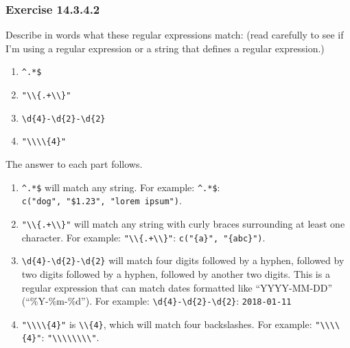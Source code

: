 \documentclass[]{book}
\providecommand{\tightlist}{%
  \setlength{\itemsep}{0pt}\setlength{\parskip}{0pt}}
\theoremstyle{plain}
\theoremstyle{remark}
\theoremstyle{definition}
\theoremstyle{definition}
\theoremstyle{definition}
\theoremstyle{remark}
\begin{document}
\hypertarget{exercise-14.3.4.2}{%
\subsubsection*{\texorpdfstring{Exercise
{14.3.4.2}}{Exercise 14.3.4.2}}\label{exercise-14.3.4.2}}

Describe in words what these regular expressions match: (read carefully
to see if I'm using a regular expression or a string that defines a
regular expression.)

\begin{enumerate}
\def\labelenumi{\arabic{enumi}.}
\tightlist
\item
  \texttt{\^{}.*\$}
\item
  \texttt{"\textbackslash{}\textbackslash{}\{.+\textbackslash{}\textbackslash{}\}"}
\item
  \texttt{\textbackslash{}d\{4\}-\textbackslash{}d\{2\}-\textbackslash{}d\{2\}}
\item
  \texttt{"\textbackslash{}\textbackslash{}\textbackslash{}\textbackslash{}\{4\}"}
\end{enumerate}

The answer to each part follows.

\begin{enumerate}
\def\labelenumi{\arabic{enumi}.}
\item
  \texttt{\^{}.*\$} will match any string. For example:
  \texttt{\^{}.*\$}: \texttt{c("dog",\ "\$1.23",\ "lorem\ ipsum")}.
\item
  \texttt{"\textbackslash{}\textbackslash{}\{.+\textbackslash{}\textbackslash{}\}"}
  will match any string with curly braces surrounding at least one
  character. For example:
  \texttt{"\textbackslash{}\textbackslash{}\{.+\textbackslash{}\textbackslash{}\}"}:
  \texttt{c("\{a\}",\ "\{abc\}")}.
\item
  \texttt{\textbackslash{}d\{4\}-\textbackslash{}d\{2\}-\textbackslash{}d\{2\}}
  will match four digits followed by a hyphen, followed by two digits
  followed by a hyphen, followed by another two digits. This is a
  regular expression that can match dates formatted like ``YYYY-MM-DD''
  (``\%Y-\%m-\%d''). For example:
  \texttt{\textbackslash{}d\{4\}-\textbackslash{}d\{2\}-\textbackslash{}d\{2\}}:
  \texttt{2018-01-11}
\item
  \texttt{"\textbackslash{}\textbackslash{}\textbackslash{}\textbackslash{}\{4\}"}
  is \texttt{\textbackslash{}\textbackslash{}\{4\}}, which will match
  four backslashes. For example:
  \texttt{"\textbackslash{}\textbackslash{}\textbackslash{}\textbackslash{}\{4\}"}:
  \texttt{"\textbackslash{}\textbackslash{}\textbackslash{}\textbackslash{}\textbackslash{}\textbackslash{}\textbackslash{}\textbackslash{}"}.
\end{enumerate}
\end{document}
